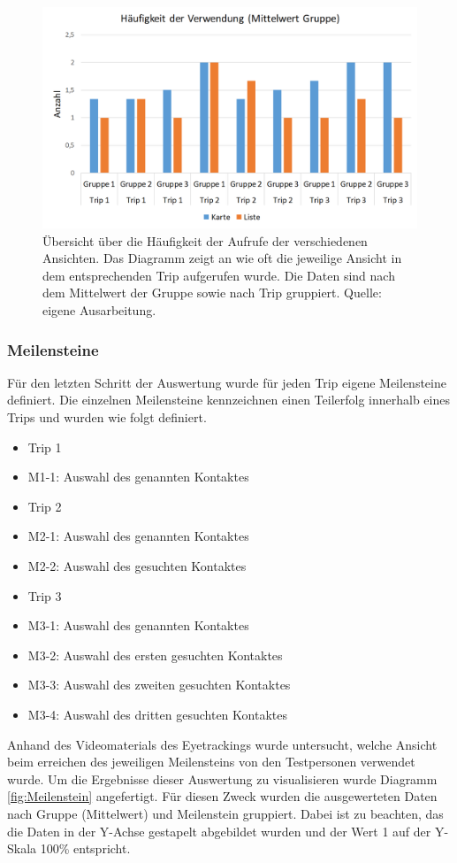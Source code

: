 \documentclass[Bachelorarbeit.tex]{subfiles}
\begin{document}
\begin{figure}[H]
\centering
\includegraphics[width=0.7\linewidth]{img/Evaluation/Darstellungsformen/Haufigkeit}
\caption[Häufigkeit der der verwendeten Ansichten]{Übersicht über die Häufigkeit der Aufrufe der verschiedenen Ansichten. Das Diagramm zeigt an wie oft die jeweilige Ansicht in dem entsprechenden Trip aufgerufen wurde. Die Daten sind nach dem Mittelwert der Gruppe sowie nach Trip gruppiert. Quelle: eigene Ausarbeitung.}
\label{fig:Haufigkeit}
\end{figure}

\subsubsection{Meilensteine}
\label{Meilensteine} 
Für den letzten Schritt der Auswertung wurde für jeden Trip eigene Meilensteine definiert. 
Die einzelnen Meilensteine kennzeichnen einen Teilerfolg innerhalb eines Trips und wurden wie folgt definiert. 
\begin{itemize}
	\item Trip 1
	\item[] M1-1: Auswahl des genannten Kontaktes 
	\item Trip 2
	\item[] M2-1: Auswahl des genannten Kontaktes
	\item[] M2-2: Auswahl des gesuchten Kontaktes
	\item Trip 3
	\item[] M3-1: Auswahl des genannten Kontaktes
	\item[] M3-2: Auswahl des ersten gesuchten Kontaktes
	\item[] M3-3: Auswahl des zweiten gesuchten Kontaktes
	\item[] M3-4: Auswahl des dritten gesuchten Kontaktes
\end{itemize}
Anhand des Videomaterials des Eyetrackings wurde untersucht, welche Ansicht beim erreichen des jeweiligen Meilensteins von den Testpersonen verwendet wurde. 
Um die Ergebnisse dieser Auswertung zu visualisieren wurde Diagramm \ref{fig:Meilenstein} angefertigt. 
Für diesen Zweck wurden die ausgewerteten Daten nach Gruppe (Mittelwert) und Meilenstein gruppiert.
Dabei ist zu beachten, das die Daten in der Y-Achse gestapelt abgebildet wurden und der Wert 1 auf der Y-Skala 100\% entspricht. 
\end{document}
